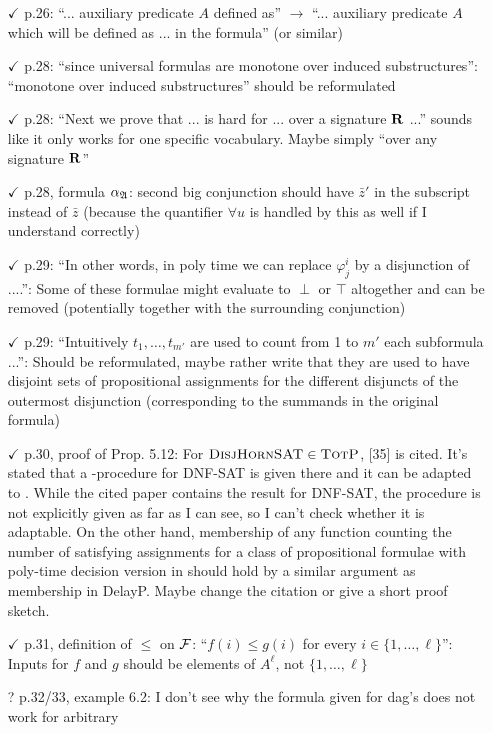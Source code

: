 \documentclass[a4paper]{article}
\begin{document}
\begin{itemize}
\item[$\checkmark$] p.26: ``... auxiliary predicate $A$ defined as'' $\to$ ``... auxiliary predicate $A$ which will be defined
as ... in the formula'' (or similar)
\item[$\checkmark$] p.28: ``since universal formulas are monotone over induced substructures'': ``monotone over
induced substructures'' should be reformulated
\item[$\checkmark$] p.28: ``Next we prove that ... is hard for ... over a signature $\mathbf{R}$ ...'' sounds like it only works
for one specific vocabulary. Maybe simply ``over any signature $\mathbf{R}$''
\item[$\checkmark$] p.28, formula $\alpha_{\mathfrak{A}}$: second big conjunction should have $\bar{z}'$ in the subscript instead of $\bar{z}$ (because
the quantifier $\forall u$ is handled by this as well if I understand correctly)
\item[$\checkmark$] p.29: ``In other words, in poly time we can replace $\varphi_j^i$ by a disjunction of ....'': Some of these
formulae might evaluate to $\perp$ or $\top$ altogether and can be removed (potentially together with
the surrounding conjunction)
\item[$\checkmark$] p.29: ``Intuitively $t_1,\ldots,t_{m'}$ are used to count from 1 to $m'$ each subformula ...'': Should be
reformulated, maybe rather write that they are used to have disjoint sets of propositional
assignments for the different disjuncts of the outermost disjunction (corresponding to the
summands in the original formula)
\item[$\checkmark$] p.30, proof of Prop. 5.12: For $\textsc{DisjHornSAT} \in \text{\sc TotP}$, [35] is cited. It’s stated that a \totp-procedure
for DNF-SAT is given there and it can be adapted to \dhsat. While the
cited paper contains the result for DNF-SAT, the procedure is not explicitly given as far as
I can see, so I can't check whether it is adaptable. On the other hand, membership of any
function counting the number of satisfying assignments for a class of propositional formulae
with poly-time decision version in \totp should hold by a similar argument as membership in
DelayP. Maybe change the citation or give a short proof sketch.
\item[$\checkmark$] p.31, definition of $\leq$ on $\mathcal{F}$: ``$f(i) \leq g(i)$ for every $i \in \{1,\ldots,\ell\}$'': Inputs for $f$ and $g$ should be
elements of $A^{\ell}$, not $\{1,\ldots,\ell\}$
\item[?] p.32/33, example 6.2: I don't see why the formula given for dag's does not work for arbitrary

\end{itemize}
\end{document}
